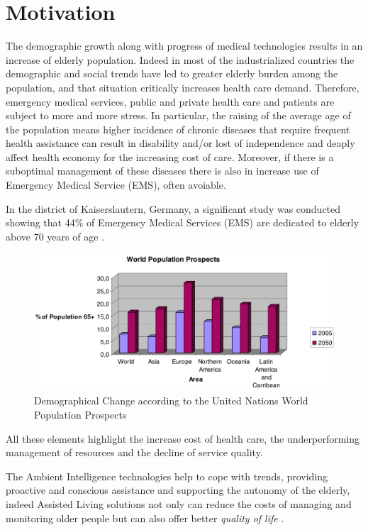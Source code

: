 \documentclass{thesisreport}
\begin{document}
\section{Motivation}
  The demographic growth along with progress of medical technologies results in an increase of elderly population. Indeed in most of the industrialized countries the demographic and social trends have led to greater elderly burden among the population, and that situation critically increases health care demand. Therefore, emergency medical services, public and private health care and patients are subject to more and more stress. 
  In particular, the raising of the average age of the population means higher incidence of chronic diseases that require frequent health assistance can result in disability and/or lost of independence and deaply affect health economy for the increasing cost of care. Moreover, if there is a suboptimal management of these diseases there is also in increase use of Emergency Medical Service (EMS), often avoiable.
 
 In the district of Kaiserslautern, Germany, a significant study was conducted showing that 44\% of Emergency Medical Services (EMS) are dedicated to elderly above 70 years of age \cite{kleinberger2007ambient}.
 	\begin{figure}[H]
		\centering
		\includegraphics[width=15cm]{Thesis/data/populationProspect.png}
		\caption{\small{Demographical Change according to the United Nations World Population Prospects \cite{kleinberger2007ambient}}}
		\label{fig:populationProspect}
	\end{figure}
 All these elements highlight the increase cost of health care, the underperforming management of resources and the decline of service quality.
 
 \parskip  \parskip
 
 The Ambient Intelligence technologies help to cope with trends, providing proactive and conscious assistance and supporting the autonomy of the elderly, indeed Assisted Living solutions not only can reduce the costs of managing and monitoring older people but can also offer better \textit{quality of life} \cite{kleinberger2007ambient}.
 
\end{document}
